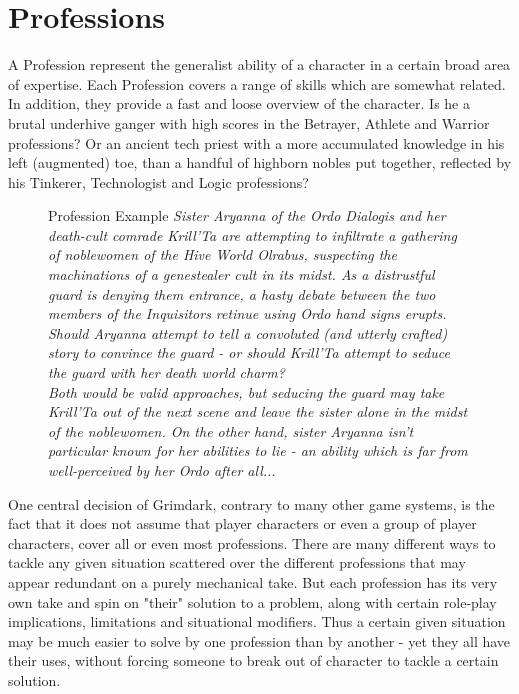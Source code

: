 \section{Professions} %
\label{sec:professions}
A Profession represent the generalist ability of a character in a certain broad area of expertise.
Each Profession covers a range of skills which are somewhat related.
In addition, they provide a fast and loose overview of the character.
Is he a brutal underhive ganger with high scores in the Betrayer, Athlete and Warrior professions?
Or an ancient tech priest with a more accumulated knowledge in his left (augmented) toe, than a handful of highborn nobles put together, reflected by his  Tinkerer, Technologist and Logic professions?
\begin{figure}[ht]
	\begin{DndSidebar}{Profession Example}
	\textit{Sister Aryanna of the Ordo Dialogis and her death-cult comrade Krill'Ta are attempting to infiltrate a gathering of noblewomen of the Hive World Olrabus, suspecting the machinations of a genestealer cult in its midst. As a distrustful guard is denying them entrance, a hasty debate between the two members of the Inquisitors retinue using Ordo hand signs erupts. Should Aryanna attempt to tell a convoluted (and utterly crafted) story to convince the guard - or should Krill'Ta attempt to seduce the guard with her death world charm?\\
	Both would be valid approaches, but seducing the guard may take Krill'Ta out of the next scene and leave the sister alone in the midst of the noblewomen. On the other hand, sister Aryanna isn't particular known for her abilities to lie - an ability which is far from well-perceived by her Ordo after all...\\}
	\end{DndSidebar}
\end{figure}

One central decision of Grimdark, contrary to many other game systems, is the fact that it does not assume that player characters or even a group of player characters, cover all or even most professions. 
There are many different ways to tackle any given situation scattered over the different professions that may appear redundant on a purely mechanical take.
But each profession has its very own take and spin on "their" solution to a problem, along with certain role-play implications, limitations and situational modifiers.
Thus a certain given situation may be much easier to solve by one profession than by another - yet they all have their uses, without forcing someone to break out of character to tackle a certain solution.

